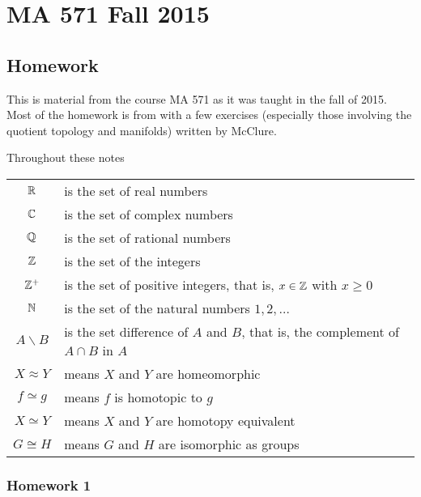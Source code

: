 \chapter{MA 571 Fall 2015}
\thispagestyle{empty}
\bigskip
\section{Homework}
This is material from the course MA 571 as it was taught in the fall of
2015. Most of the homework is from \cite{munkres} with a few exercises
(especially those involving the quotient topology and manifolds) written by
McClure.


Throughout these notes

\begin{tabular}{cl}
  $\mathbb{R}$ & is the set of real numbers\\
  $\mathbb{C}$ & is the set of complex numbers\\
  $\mathbb{Q}$ & is the set of rational numbers\\
  $\mathbb{Z}$ & is the set of the integers\\
  $\mathbb{Z}^+$ & is the set of positive integers, that is, $x\in\mathbb{Z}$ with
             $x\geq 0$\\
  $\mathbb{N}$ & is the set of the natural numbers $1,2,\dotsc$\\
  $A\smallsetminus B$ & is the set difference of $A$ and $B$, that is, the
                        complement of $A\cap B$ in $A$\\
  $X\approx Y$& means $X$ and $Y$ are homeomorphic\\
  $f\simeq g$& means $f$ is homotopic to $g$\\
  $X\simeq Y$&means $X$ and $Y$ are homotopy equivalent\\
  $G\cong H$& means $G$ and $H$ are isomorphic as groups
\end{tabular}

\newpage
\subsection{Homework 1}


